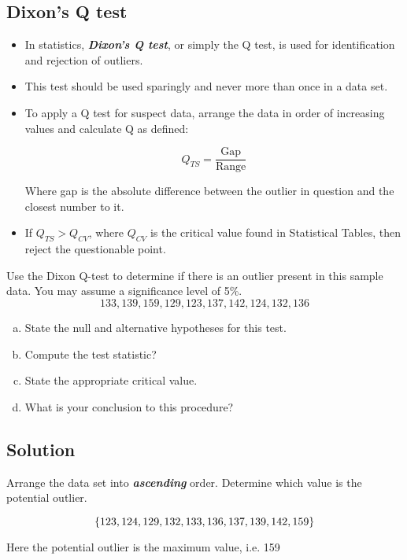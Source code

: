 \documentclass[a4paper,12pt]{article}
\begin{document}
\large 


\subsection*{Dixon's Q test}

\begin{itemize}
    \item In statistics, \textbf{\textit{Dixon's Q test}}, or simply the Q test, is used for identification and rejection of outliers. \item This test should be used sparingly and never more than once in a data set.
    \item To apply a Q test for suspect data, arrange the data in order of increasing values and calculate Q as defined:

\[
Q_{TS} = \frac{\mbox{Gap}}{\mbox{Range}}
\]

Where gap is the absolute difference between the outlier in question and the closest number to it. 
\item If $Q_{TS} > Q_{CV}$, where $Q_{CV}$ is the critical value found in Statistical Tables, then reject the questionable point.
\end{itemize}


\newpage 

\noindent Use the Dixon Q-test to determine if there is an outlier present in this sample data. You may assume
a significance level of 5\%.
\[ 133, 139, 159, 129, 123, 
  137, 142, 124, 132, 136\]
\begin{enumerate}[(a)]
\item  State the null and alternative hypotheses for this test.
\item  Compute the test statistic?
\item  State the appropriate critical value.
\item  What is your conclusion to this procedure?
\end{enumerate}



\subsection*{Solution}
Arrange the data set into \textbf{\textit{ascending}} order. Determine which value is the potential outlier.

\[\LARGE \{ 123, 124, 129, 132, 133, 136, 137, 139, 142, 159\} \]

\noindent Here the potential outlier is the maximum value, i.e. 159
\end{document}
